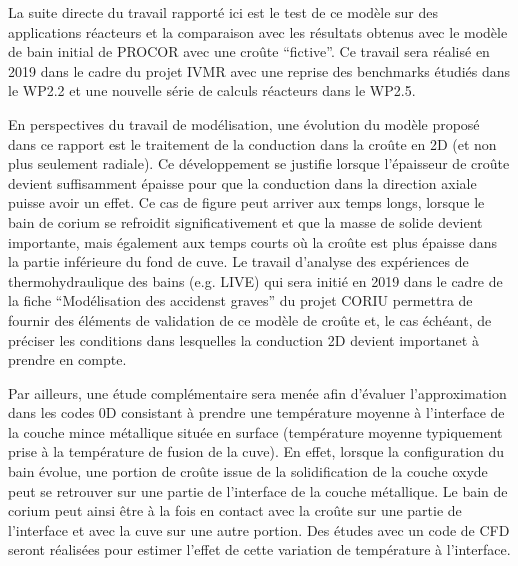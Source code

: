 La suite directe du travail rapporté ici est le test de ce modèle sur des applications réacteurs et la comparaison avec les résultats obtenus avec le modèle de bain initial de PROCOR avec une croûte ``fictive''. Ce travail sera réalisé en 2019 dans le cadre du projet IVMR avec une reprise des benchmarks étudiés dans le WP2.2 et une nouvelle série de calculs réacteurs dans le WP2.5.

En perspectives du travail de modélisation, une évolution du modèle proposé dans ce rapport est le traitement de la conduction dans la croûte en 2D (et non plus seulement radiale). Ce développement se justifie lorsque l'épaisseur de croûte devient suffisamment épaisse pour que la conduction dans la direction axiale puisse avoir un effet. Ce cas de figure peut arriver aux temps longs, lorsque le bain de corium se refroidit significativement et que la masse de solide devient importante, mais également aux temps courts où la croûte est plus épaisse dans la partie inférieure du fond de cuve. Le travail d'analyse des expériences de thermohydraulique des bains (e.g. LIVE) qui sera initié en 2019 dans le cadre de la fiche ``Modélisation des accidenst graves'' du projet CORIU permettra de fournir des éléments de validation de ce modèle de croûte et, le cas échéant, de préciser les conditions dans lesquelles la conduction 2D devient importanet à prendre en compte.

Par ailleurs, une étude complémentaire sera menée afin d'évaluer l'approximation dans les codes 0D consistant à prendre une température moyenne à l'interface de la couche mince métallique située en surface (température moyenne typiquement prise à la température de fusion de la cuve). En effet, lorsque la configuration du bain évolue, une portion de croûte issue de la solidification de la couche oxyde peut se retrouver sur une partie de l'interface de la couche métallique. Le bain de corium peut ainsi être à la fois en contact avec la croûte sur une partie de l'interface et avec la cuve sur une autre portion. Des études avec un code de CFD seront réalisées pour estimer l'effet de cette variation de température à l'interface.
